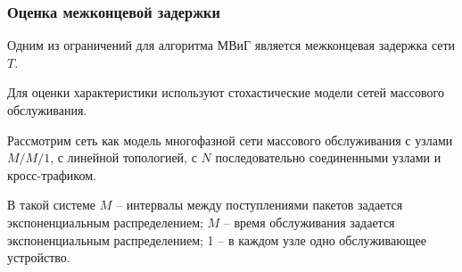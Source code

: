 \begin{frame}
    \justifying
    \frametitle{Оценка межконцевой задержки}
    \fontsize{8pt}{7.2}\selectfont

    Одним из ограничений для алгоритма МВиГ является межконцевая задержка сети $T$.
    \bigskip

    Для оценки характеристики используют стохастические модели сетей массового обслуживания.

    \bigskip

    {Рассмотрим сеть как модель многофазной сети массового обслуживания  с узлами $M/M/1$, с линейной топологией, с $N$ последовательно соединенными узлами и кросс-трафиком. 

    \bigskip

    В такой системе $M$ -- интервалы между поступлениями пакетов задается экспоненциальным распределением; $M$ --  время обслуживания задается экспоненциальным распределением; 1 -- в каждом узле одно обслуживающее устройство.}

   
\end{frame}




    





    
